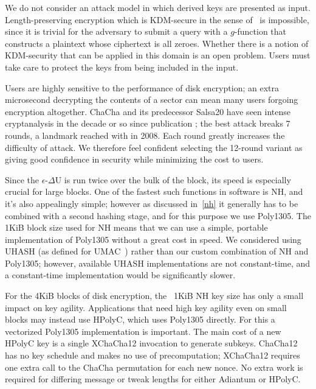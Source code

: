 \documentclass[eprint.tex]{subfiles}
\begin{document}
We do not consider an attack model in which derived keys are presented as input.
Length-preserving encryption
which is KDM-secure in the sense of~\cite{kdm} is impossible, since it is trivial for the
adversary to submit a query with a $g$-function
that constructs a plaintext whose ciphertext is all zeroes.
Whether there is a notion of KDM-security that can be
applied in this domain is an open problem. Users must take care to protect the keys from being
included in the input.

Users are highly sensitive to the performance of disk encryption; an
extra microsecond decrypting the contents of a sector can mean many users
forgoing encryption altogether. ChaCha and its predecessor Salsa20
have seen intense cryptanalysis in the decade or so since publication
\cite{tdcs20,nonrandomsalsa,tsunoo,latindance,ishiguro2011,ishiguro2012,zhenqing2012,
maitra2015,chachamaitra,choudhuri2016,dey2017,Choudhuri_Maitra_2017,chacha2018};
the best attack breaks 7 rounds, a landmark reached with \cite{latindance} in 2008.
Each round greatly increases the difficulty of attack.
We therefore feel confident selecting the 12-round variant as giving
good confidence in security while minimizing the cost to users.

Since the $\epsilon$-$\Delta$U is run twice over the bulk of the block, its speed is especially
crucial for large blocks. One of the fastest such functions in software is NH, and
it's also appealingly simple; however as discussed in~\autoref{nh} it generally has to be
combined with a second hashing stage, and for this purpose we use Poly1305. The 1KiB block size
used for NH means that we can use a simple, portable implementation of Poly1305 without a great
cost in speed.  We considered using UHASH (as defined for UMAC~\cite{rfc4418}) rather than our
custom combination of NH and Poly1305; however, available UHASH implementations
are not constant-time, and a constant-time implementation would be significantly
slower.

For the 4KiB blocks of disk encryption,
the ~1KiB NH key size has only a small impact on key agility. Applications
that need high key agility even on small blocks may instead use HPolyC, which
uses Poly1305 directly. For this a vectorized Poly1305 implementation is important.  The main
cost of a new HPolyC key is a single XChaCha12 invocation to generate subkeys.
ChaCha12 has no key schedule
and makes no use of precomputation; XChaCha12
requires one extra call to the ChaCha permutation for each new nonce.
No extra work is required for differing message or tweak lengths for either Adiantum
or HPolyC.
\end{document}
